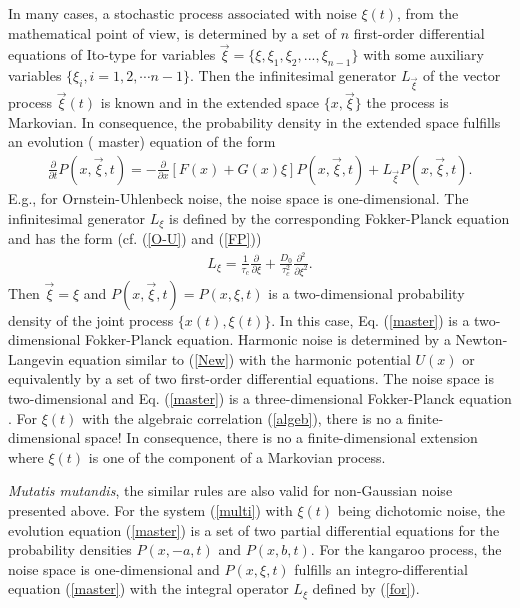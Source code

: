 \documentclass[authoryear,draft,1p,times]{elsarticle}
\renewcommand{\=}{\stackrel{\mathrm{d}}{=}}
\begin{document}
In many cases, a stochastic process associated with noise $\xi(t)$, 
from the mathematical point of view, is determined by a 
set of $n$ first-order differential  
 equations of Ito-type \cite{thomas,gar} for variables 
$\vec \xi =\{\xi, \xi_1, \xi_2, ..., \xi_{n-1}\}$ with some 
auxiliary variables $\{\xi_i, i=1,2,\cdots n-1\}$. Then 
 the infinitesimal generator $L_{\vec \xi}$ of the vector process 
$\vec \xi(t)$ is known and in the extended space $\{x, {\vec \xi}\}$ 
the process 
 is Markovian. In consequence, the probability density 
in the extended space 
fulfills an evolution ( master) equation of the form \cite{van} 
\begin{eqnarray}  \label{master}
 \frac{\partial}{\partial t} P(x,{\vec \xi}, t)
= -\frac{\partial}{\partial  x} \left[ F(x)+G(x)\xi\right] P(x,{\vec \xi},t) 
 +  L_{\vec \xi} P(x, {\vec \xi}, t).
\end{eqnarray}
%
E.g., for Ornstein-Uhlenbeck noise, the noise space is one-dimensional. 
The infinitesimal generator $L_{\xi}$ is defined by the corresponding 
Fokker-Planck equation and has the form (cf. (\ref{O-U}) and (\ref{FP}))
%
\begin{eqnarray}  \label{genO-U}
L_{\xi} = \frac{1}{\tau_c} \frac{\partial}{\partial  \xi}  
 + \frac{D_0}{\tau_c^2} \frac{\partial^2}{\partial \xi^2}. 
\end{eqnarray}
% 
Then $ \vec \xi =\xi$ and $P(x,{\vec \xi}, t)=P(x, \xi, t)$ is a 
two-dimensional probability density of the joint process $\{x(t), \xi(t)\}$. 
In this case, Eq. (\ref{master}) is a two-dimensional Fokker-Planck equation. 
Harmonic noise is determined by a Newton-Langevin equation similar 
to (\ref{New}) with the harmonic potential $U(x)$ or equivalently  
by a set of two first-order differential 
equations. The noise space  is  two-dimensional and 
Eq. (\ref{master}) is a three-dimensional Fokker-Planck equation \cite{bart}. 
 For $\xi(t)$ with the  algebraic correlation  
(\ref{algeb}), there is no a finite-dimensional space!  In consequence, 
 there is no a finite-dimensional extension where $\xi(t)$ is 
one of the component of a Markovian process. 

{\it Mutatis mutandis}, the similar rules are also valid for non-Gaussian noise 
presented above. For the system (\ref{multi}) with $\xi(t)$ being 
dichotomic noise, the evolution equation (\ref{master}) is a set of two 
partial differential equations for the probability densities 
$P(x,-a,t)$ and $P(x,b,t)$. 
For the kangaroo 
process, the noise space  is one-dimensional and $P(x,\xi,t)$ 
fulfills an integro-differential equation (\ref{master}) with the integral 
operator $L_{\xi}$ defined by (\ref{for}).  
\end{document}
